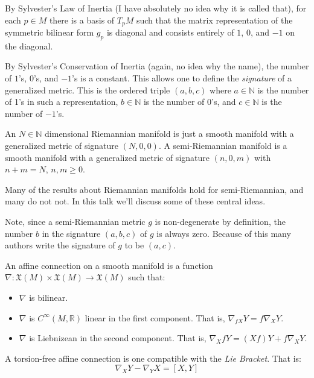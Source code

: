 \documentclass{beamer}
\begin{document}
    \begin{frame}
        By Sylvester's Law of Inertia (I have absolutely no idea why it is
        called that), for each $p\in{M}$ there is a basis of $T_{p}M$ such that
        the matrix representation of the symmetric bilinear form $g_{p}$
        is diagonal and consists entirely of $1$, $0$, and $-1$ on the diagonal.
        \par\hfill\par
        By Sylvester's Conservation of Inertia (again, no idea why the name),
        the number of $1$'s, $0$'s, and $-1$'s is a constant. This allows one to
        define the \textit{signature} of a generalized metric. This is the
        ordered triple $(a,b,c)$ where $a\in\mathbb{N}$ is the number of 1's
        in such a representation, $b\in\mathbb{N}$ is the number of 0's, and
        $c\in\mathbb{N}$ is the number of $-1$'s.
    \end{frame}
    \begin{frame}
        An $N\in\mathbb{N}$ dimensional Riemannian manifold is just a smooth
        manifold with a generalized metric of signature $(N,0,0)$. A
        semi-Riemannian manifold is a smooth manifold with a generalized metric
        of signature $(n,0,m)$ with $n+m=N$, $n,m\geq{0}$.
        \par\hfill\par
        Many of the results about Riemannian manifolds hold for semi-Riemannian,
        and many do not not. In this talk we'll discuss some of these central
        ideas.
        \par\hfill\par
        Note, since a semi-Riemannian metric $g$ is non-degenerate by
        definition, the number $b$ in the signature $(a,b,c)$ of $g$ is always
        zero. Because of this many authors write the signature of $g$ to be
        $(a,c)$.
    \end{frame}
    \begin{frame}
        An affine connection on a smooth manifold is a function
        $\nabla:\mathfrak{X}(M)\times\mathfrak{X}(M)\rightarrow\mathfrak{X}(M)$
        such that:
        \begin{itemize}
            \item $\nabla$ is bilinear.
            \item $\nabla$ is $C^{\infty}(M,\mathbb{R})$ linear in the first
                component. That is, $\nabla_{fX}Y=f\nabla_{X}Y$.
            \item $\nabla$ is Liebnizean in the second component. That is,
                $\nabla_{X}fY=(Xf)Y+f\nabla_{X}Y$.
        \end{itemize}
        A torsion-free affine connection is one compatible with the
        \textit{Lie Bracket}. That is:
        \begin{equation}
            \nabla_{X}Y-\nabla_{Y}X=[X,Y]
        \end{equation}
    \end{frame}
\end{document}
